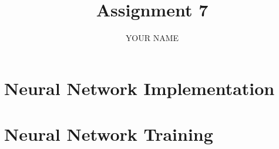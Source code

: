 \documentclass[12pt,a4paper]{article}
\title{\vspace{-5cm} Assignment 7}
\author{YOUR NAME}
\begin{document}
\maketitle

\tableofcontents

\section{Neural Network Implementation}

\section{Neural Network Training}
\end{document}
